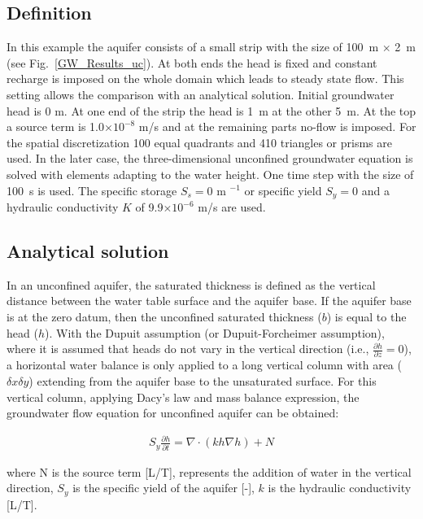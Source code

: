%
%
\subsection{Definition}
%
In this example the aquifer consists of a small strip with the size of 100~m $\times$ 2~m (see Fig.~\ref{GW_Results_uc}). At both ends the head is fixed and constant recharge is imposed on the whole domain which leads to steady state flow. This setting allows the comparison with an analytical solution.
%
Initial groundwater head is 0 m. At one end of the strip the head is 1~m at the other 5~m. At the top a source term is 1.0$\times 10^{-8}$ m/s and at the remaining parts no-flow is imposed.
%
For the spatial discretization 100 equal quadrants and 410 triangles or prisms are used. In the later case, the three-dimensional unconfined groundwater equation is solved with elements adapting to the water height. One time step with the size of 100~s is used. The specific storage $S_s = 0$ m $^{-1}$ or specific yield $S_y = 0$ and a hydraulic conductivity $K$ of 9.9$\times 10^{-6}$ m/s are used.

\subsection{Analytical solution}
In an unconfined aquifer, the saturated thickness is defined as the vertical distance between the water table surface and the aquifer base. If the aquifer base is at the zero datum, then the unconfined saturated thickness ($b$) is equal to the head ($h$).
With the Dupuit assumption (or Dupuit-Forcheimer assumption), where it is assumed that heads do not vary in the vertical direction (i.e., $ \frac {\partial h} {\partial z}=0$), a horizontal water balance is only applied to a long vertical column with area ($\delta x \delta y$) extending from the aquifer base to the unsaturated surface. For this vertical column, applying Dacy's law and mass balance expression, the groundwater flow equation for unconfined aquifer can be obtained:

\begin{eqnarray}
S_y \frac {\partial h} {\partial t} = \nabla\cdot(kh\nabla h) +N
\label{GW_unconfinedEq1}
\end{eqnarray}

where N is the source term [L/T], represents the addition of water in the vertical direction, $S_y$ is the specific yield of the aquifer [-], $k$ is the hydraulic conductivity [L/T].

